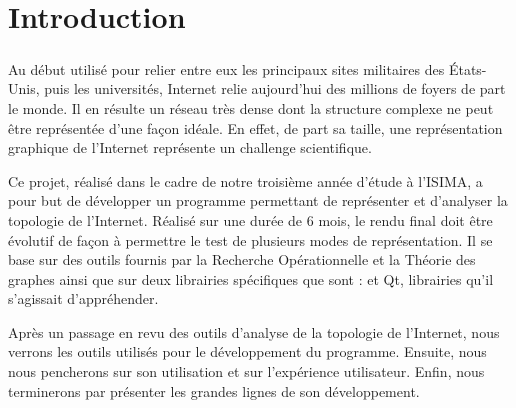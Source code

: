 \section*{Introduction}

\subparagraph{}
Au d\'ebut utilis\'e pour relier entre eux les principaux sites militaires des \'Etats-Unis, puis les universit\'es, Internet relie aujourd'hui des millions de foyers de part le monde. Il en r\'esulte un r\'eseau tr\`es dense dont la structure complexe ne peut \^etre repr\'esent\'ee d'une fa\c con id\'eale. En effet, de part sa taille, une repr\'esentation graphique de l'Internet repr\'esente un challenge scientifique.
\par
Ce projet, r\'ealis\'e dans le cadre de notre troisi\`eme ann\'ee d'\'etude \`a l'ISIMA, a pour but de d\'evelopper un programme permettant de repr\'esenter et d'analyser la topologie de l'Internet. R\'ealis\'e sur une dur\'ee de 6 mois, le rendu final doit \^etre \'evolutif de fa\c con \`a permettre le test de plusieurs modes de repr\'esentation.
Il se base sur des outils fournis par la Recherche Op\'erationnelle et la Th\'eorie des graphes ainsi que sur deux librairies sp\'ecifiques que sont : \boost et Qt, librairies qu'il s'agissait d'appr\'ehender.
\par
Apr\`es un passage en revu des outils d'analyse de la topologie de l'Internet, nous verrons les outils utilis\'es pour le d\'eveloppement du programme. Ensuite, nous nous pencherons sur son utilisation et sur l'exp\'erience utilisateur. Enfin, nous terminerons par pr\'esenter les grandes lignes de son d\'eveloppement.

